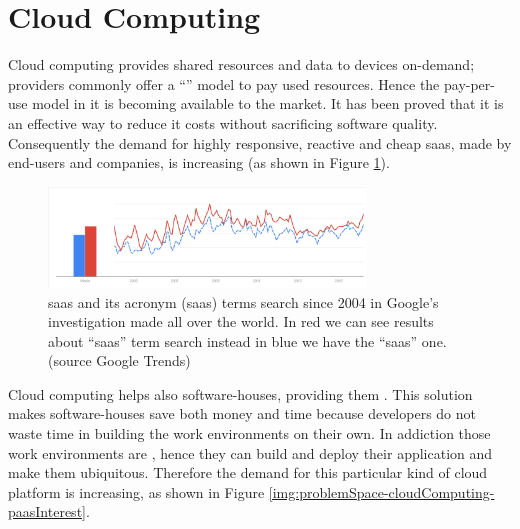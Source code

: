 %
%
\section{Cloud Computing}
\label{sec:problemSpace-cloudComputing}
Cloud computing provides shared resources and data to devices on-demand; providers commonly offer a 
``'' model to pay used resources. Hence the pay-per-use model
in \acs{it} is becoming available to the market. It has been proved that it is an effective way to
reduce \acs{it} costs without sacrificing software quality. Consequently the demand for highly
responsive, reactive and cheap \ac{saas}, made by end-users and companies, is increasing (as shown
in Figure \ref{img:problemSpace-cloudComputing-saasInterest}).

 
\begin{figure}
	\centering{}
 	\includegraphics[width=0.75\textwidth]{chapters/problem/images/saas-interest.png}
 	\caption[Trends in searching ``\acs{saas}'' on Google]{\acf{saas} and its acronym (\acs{saas})
 		terms search since 2004 in Google's investigation made all over the world. In red we can see
 		results about ``\acs{saas}'' term search instead in blue we have the ``\acf{saas}'' one. 
 		(\footnotesize{source	Google Trends}\normalsize{)}}
 	\label{img:problemSpace-cloudComputing-saasInterest}
\end{figure}

Cloud computing helps also software-houses, providing them .
This solution makes software-houses save both money and time because developers do not waste time in 
building the work environments on their own. In addiction those work environments are ,
hence they can build and deploy their application and make them ubiquitous. Therefore the demand for
this particular kind of cloud platform is increasing, as shown in Figure
\ref{img:problemSpace-cloudComputing-paasInterest}.

